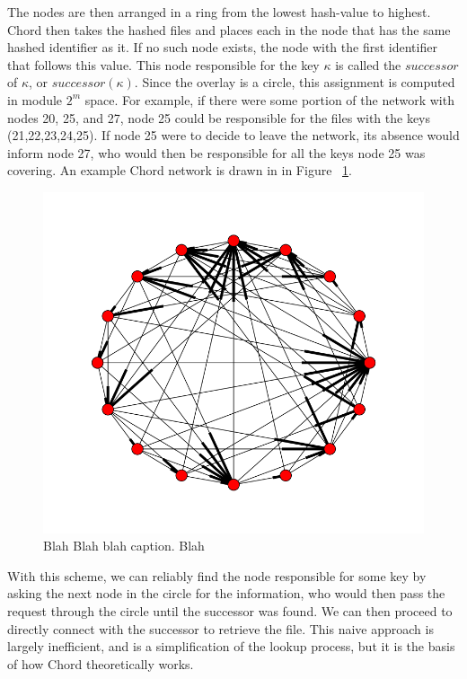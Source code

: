 \documentclass[conference, compsocconf, letterpaper]{IEEEtran}
\begin{document}
The nodes are then arranged in a ring from the lowest hash-value to highest.  Chord then takes the hashed files and places each in the node that has the same hashed identifier as it.  If no such node exists, the node with the first identifier that follows this value.  This node responsible for the key $\kappa$ is called the $successor$ of $\kappa$, or $successor(\kappa)$.  Since the overlay is a circle, this assignment is computed in module $2^m$ space.  For example, if there were some portion of the network with nodes 20, 25, and 27, node 25 could be responsible for the files with the keys (21,22,23,24,25). If node 25 were to decide to leave the network, its absence would inform node 27, who would then be responsible for all the keys node 25 was covering. An example Chord network is drawn in in Figure ~\ref{chordreal}.
\begin{figure}
    \includegraphics[width=\linewidth]{chordreal}
    \caption{Blah Blah blah caption.  Blah}
    \label{chordreal}
\end{figure}


With this scheme, we can reliably find the node responsible for some key by asking the next node in the circle for the information, who would then pass the request through the circle until the successor was found.  We can then proceed to directly connect with the successor to retrieve the file.  This naive approach is largely inefficient, and is a simplification of the lookup process, but it is the basis of how Chord theoretically works.
\end{document}
